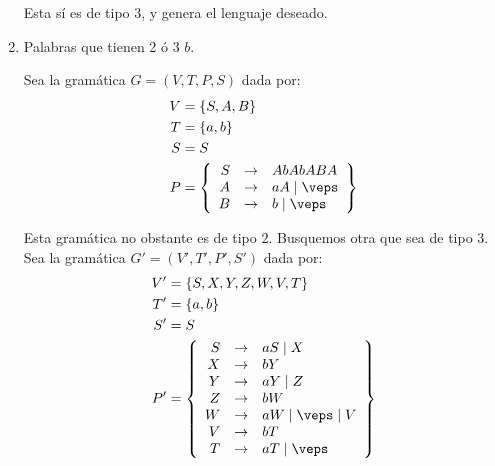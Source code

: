 \begin{ejercicio}
\begin{enumerate}
        Esta sí es de tipo $3$, y genera el lenguaje deseado.



        \item Palabras que tienen 2 ó 3 $b$.
        
        Sea la gramática $G=\left(V,T,P,S\right)$ dada por:
        \begin{align*}
            V &= \{S, A, B\} \\
            T &= \{a,b\} \\
            S &= S \\
            P &= \left\{
                \begin{array}{rcl}
                    S &\rightarrow & AbAbABA \\
                    A &\rightarrow & aA \mid \veps \\
                    B &\rightarrow & b \mid \veps
                \end{array}
            \right\}
        \end{align*}

        Esta gramática no obstante es de tipo $2$. Busquemos otra que sea de tipo 3.
        Sea la gramática $G'=\left(V',T',P',S'\right)$ dada por:
        \begin{align*}
            V' &= \{S, X,Y,Z,W,V,T\} \\
            T' &= \{a,b\} \\
            S' &= S \\
            P' &= \left\{
                \begin{array}{rcl}
                    S &\rightarrow & aS \mid X \\
                    X &\rightarrow & bY \\
                    Y &\rightarrow & aY \mid Z \\
                    Z &\rightarrow & bW \\
                    W &\rightarrow & aW \mid \veps \mid V \\
                    V &\rightarrow & bT \\
                    T &\rightarrow & aT \mid \veps
                \end{array}
            \right\}
        \end{align*}


\end{enumerate}
\end{ejercicio}
